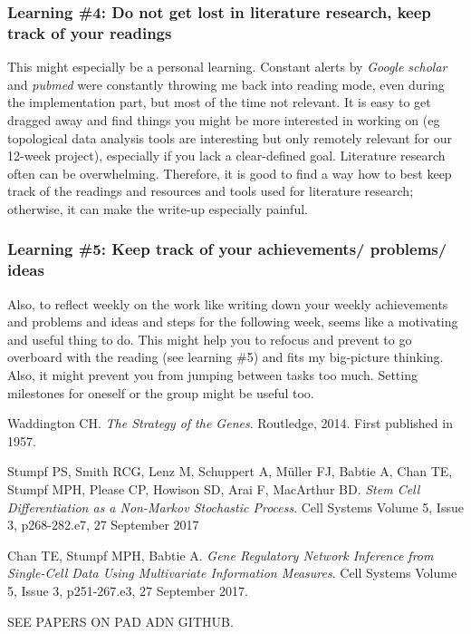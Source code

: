 \documentclass[journal, a4paper]{IEEEtran}
\begin{document}
\subsubsection{Learning \#4: Do not get lost in literature research, keep track of your readings}
This might especially be a personal learning. Constant alerts by \textit{Google scholar} and \textit{pubmed} were constantly throwing me back into reading mode, even during the implementation part, but most of the time not relevant. It is easy to get dragged away and find things you might be more interested in working on (eg topological data analysis tools are interesting but only remotely relevant for our 12-week project), especially if you lack a clear-defined goal. Literature research often can be overwhelming. Therefore, it is good to find a way how to best keep track of the readings and resources and tools used for literature research; otherwise, it can make the write-up especially painful. %

\hfill
\subsubsection{Learning \#5: Keep track of your achievements/ problems/ ideas}
Also, to reflect weekly on the work like writing down your weekly achievements and problems and ideas and steps for the following week, seems like a motivating and useful thing to do. This might help you to refocus and prevent to go overboard with the reading (see learning \#5) and fits my big-picture thinking. Also, it might prevent you from jumping between tasks too much. Setting milestones for oneself or the group might be useful too. 



\begin{thebibliography}{99}
	
	Waddington CH. \textit{The Strategy of the Genes}. Routledge, 2014. First published in 1957. 
	
	Stumpf PS, Smith RCG, Lenz M, Schuppert A, M{\"u}ller FJ, Babtie A,
	Chan TE, Stumpf MPH, Please CP, Howison SD, Arai F, MacArthur BD. \textit{Stem Cell Differentiation as a Non-Markov Stochastic Process}. Cell Systems Volume 5, Issue 3, p268-282.e7, 27 September 2017 
	
	Chan TE, Stumpf MPH, Babtie A. \textit{Gene Regulatory Network Inference from Single-Cell Data Using Multivariate Information Measures}. Cell Systems Volume 5, Issue 3, p251-267.e3, 27 September 2017.
	
	
	SEE PAPERS ON PAD ADN GITHUB.
	
	
\end{thebibliography}

\end{document}
